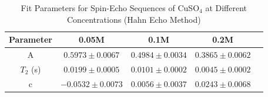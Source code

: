 \documentclass[12pt]{article}
\begin{document}
\begin{table}[ht]
\label{tab:se}
\centering
\begin{tabular}{ccccc}
\toprule
\textbf{Parameter} & \textbf{0.05M} & \textbf{0.1M} & \textbf{0.2M} \\
\midrule
A & $0.5973 \pm 0.0067$ & $0.4984 \pm 0.0034$ & $0.3865 \pm 0.0062$ \\
$T_2$ (s) & $0.0199 \pm 0.0005$ & $0.0101 \pm 0.0002$ & $0.0045 \pm 0.0002$ \\
c & $-0.0532 \pm 0.0073$ & $0.0056 \pm 0.0037$ & $0.0243 \pm 0.0068$ \\
\bottomrule
\end{tabular}
\caption{Fit Parameters for Spin-Echo Sequences of CuSO$_4$ at Different Concentrations (Hahn Echo Method)}
\end{table}
\end{document}
